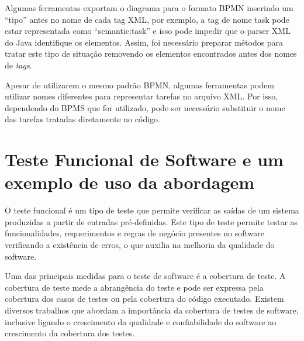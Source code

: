 \documentclass[12pt]{article}
\begin{document}
Algumas ferramentas exportam o diagrama para o formato BPMN inserindo um ``tipo'' antes no nome de cada tag XML, por exemplo, a tag de nome task pode estar representada como ``semantic:task'' e isso pode impedir que o parser XML do Java identifique os elementos. Assim, foi necessário preparar métodos para tratar este tipo de situação removendo os elementos encontrados antes dos nomes de \emph{tags}.

Apesar de utilizarem o mesmo padrão BPMN, algumas ferramentas podem utilizar nomes diferentes para representar tarefas no arquivo XML. Por isso, dependendo do BPMS que for utilizado, pode ser necessário substituir o nome das tarefas tratadas diretamente no código.




\section{Teste Funcional de Software e um exemplo de uso da abordagem}
O teste funcional é um tipo de teste que permite verificar as saídas de um sistema produzidas a partir de entradas pré-definidas. Este tipo de teste permite testar as funcionalidades, requerimentos e regras de negócio presentes no software\cite{molinari2003testes} verificando a existência de erros, o que auxilia na melhoria da qualidade do software.

Uma das principais medidas para o teste de software é a cobertura de teste. A cobertura de teste mede a abrangência do teste e pode ser expressa pela cobertura dos casos de testes ou pela cobertura do código executado. Existem diversos trabalhos que abordam a importância da cobertura de testes de software\cite{zhu1997software,bieman1996using}, inclusive ligando o crescimento da qualidade e confiabilidade do software ao crescimento da cobertura dos testes\cite{malaiya2002software}.

\end{document}
